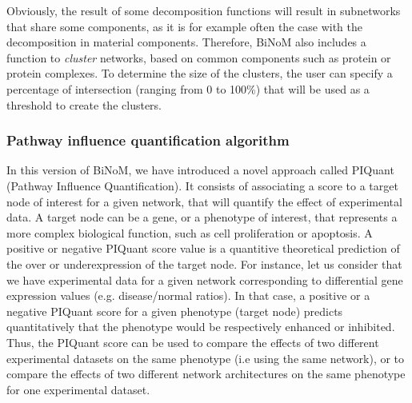 \documentclass[10pt]{bmc_article}
\newenvironment{bmcformat}{\baselineskip20pt\sloppy\setboolean{publ}{false}}{\baselineskip20pt\sloppy}
\begin{document}
\begin{bmcformat}
Obviously, the result of some decomposition functions will result in subnetworks
that share some components, as it is for example often the case
with the decomposition in material components. Therefore, BiNoM also includes a
function to \emph{cluster} networks, based on common components such as protein
or protein complexes. To determine the size of the clusters, the user can
specify a percentage of intersection (ranging from 0 to 100\%) that will be used
as a threshold to create the clusters.

\subsubsection*{Pathway influence quantification algorithm}

In this version of BiNoM, we have introduced a novel approach called PIQuant
(Pathway Influence Quantification). It consists of associating a score to a
target node of interest for a given network, that will quantify the effect of
experimental data.
A target node can be a gene, or a phenotype of interest, that represents a more complex
biological function, such as cell proliferation or apoptosis.
A positive or negative PIQuant score value is a quantitive theoretical
prediction of the over or underexpression of
the target node. For instance, let us consider that we have experimental data for a given network
 corresponding to differential gene expression values (e.g.
disease/normal ratios).
In that case, a positive or a negative PIQuant score for a given phenotype
(target node) predicts quantitatively
that the phenotype would be respectively enhanced or inhibited. 
Thus, the PIQuant score can be used to
compare the effects of two different experimental datasets on the same phenotype
(i.e using the same network), or to compare the effects of two different network
architectures on the same phenotype for one experimental dataset.



\end{bmcformat}
\end{document}
